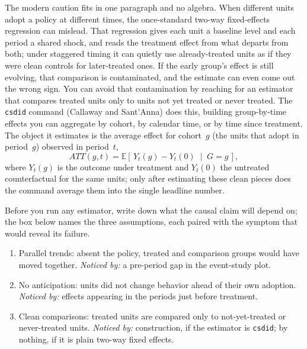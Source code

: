 The modern caution fits in one paragraph and no algebra. When different units adopt a policy at different times, the once-standard two-way fixed-effects regression can mislead. That regression gives each unit a baseline level and each period a shared shock, and reads the treatment effect from what departs from both; under staggered timing it can quietly use already-treated units as if they were clean controls for later-treated ones. If the early group's effect is still evolving, that comparison is contaminated, and the estimate can even come out the wrong sign. You can avoid that contamination by reaching for an estimator that compares treated units only to units not yet treated or never treated. The \texttt{csdid} command (Callaway and Sant'Anna) does this, building group-by-time effects you can aggregate by cohort, by calendar time, or by time since treatment. The object it estimates is the average effect for cohort~$g$ (the units that adopt in period~$g$) observed in period~$t$,
\[
ATT(g,t)=\mathbb{E}\!\left[\,Y_t(g)-Y_t(0)\;\middle|\;G=g\,\right],
\]
where $Y_t(g)$ is the outcome under treatment and $Y_t(0)$ the untreated counterfactual for the same units; only after estimating these clean pieces does the command average them into the single headline number.

Before you run any estimator, write down what the causal claim will depend on; the box below names the three assumptions, each paired with the symptom that would reveal its failure.

\begin{restson}
\begin{enumerate}
\item Parallel trends: absent the policy, treated and comparison groups would have moved together. \emph{Noticed by:} a pre-period gap in the event-study plot.
\item No anticipation: units did not change behavior ahead of their own adoption. \emph{Noticed by:} effects appearing in the periods just before treatment.
\item Clean comparisons: treated units are compared only to not-yet-treated or never-treated units. \emph{Noticed by:} construction, if the estimator is \texttt{csdid}; by nothing, if it is plain two-way fixed effects.
\end{enumerate}
\end{restson}

